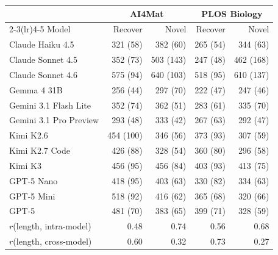 \begin{tabular}{lrrrr}
\toprule
 & \multicolumn{2}{c}{AI4Mat} & \multicolumn{2}{c}{PLOS Biology} \\
\cmidrule(lr){2-3}\cmidrule(lr){4-5}
Model & Recover & Novel & Recover & Novel \\
\midrule
Claude Haiku 4.5 & 321 (58) & 382 (60) & 265 (54) & 344 (63) \\
Claude Sonnet 4.5 & 352 (73) & 503 (143) & 247 (48) & 462 (168) \\
Claude Sonnet 4.6 & 575 (94) & 640 (103) & 518 (95) & 610 (137) \\
Gemma 4 31B & 256 (44) & 297 (70) & 222 (47) & 247 (46) \\
Gemini 3.1 Flash Lite & 352 (74) & 362 (51) & 283 (61) & 335 (70) \\
Gemini 3.1 Pro Preview & 293 (48) & 333 (42) & 267 (63) & 292 (47) \\
Kimi K2.6 & 454 (100) & 346 (56) & 373 (93) & 307 (59) \\
Kimi K2.7 Code & 426 (88) & 328 (54) & 360 (80) & 296 (58) \\
Kimi K3 & 456 (95) & 456 (84) & 403 (93) & 413 (75) \\
GPT-5 Nano & 418 (95) & 403 (63) & 330 (82) & 334 (63) \\
GPT-5 Mini & 518 (92) & 416 (62) & 365 (68) & 320 (66) \\
GPT-5 & 481 (70) & 383 (65) & 399 (71) & 328 (59) \\
\midrule
$r$(length, intra-model) & 0.48 & 0.74 & 0.56 & 0.68 \\
$r$(length, cross-model) & 0.60 & 0.32 & 0.73 & 0.27 \\
\bottomrule
\end{tabular}
